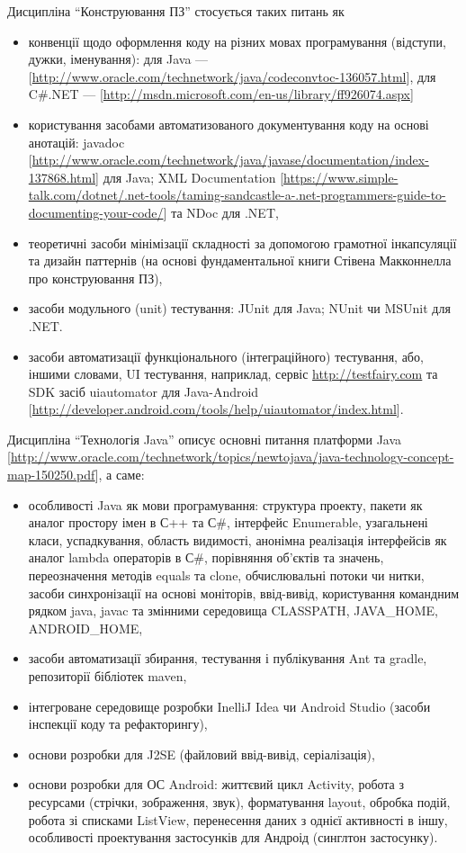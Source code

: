 Дисципліна ``Конструювання ПЗ'' стосується таких питань як
\begin{itemize} 
\item конвенції щодо оформлення коду на різних мовах програмування (відступи, дужки, іменування): для Java --- [\url{http://www.oracle.com/technetwork/java/codeconvtoc-136057.html}], 
для C\#.NET --- [\url{http://msdn.microsoft.com/en-us/library/ff926074.aspx}]
\item користування засобами автоматизованого документування коду на основі анотацій: javadoc [\url{http://www.oracle.com/technetwork/java/javase/documentation/index-137868.html}] для Java; XML Documentation [\url{https://www.simple-talk.com/dotnet/.net-tools/taming-sandcastle-a-.net-programmers-guide-to-documenting-your-code/}] та NDoc для .NET, 
\item теоретичні засоби мінімізації складності за допомогою грамотної інкапсуляції та дизайн паттернів (на основі фундаментальної книги Стівена Макконнелла про конструювання ПЗ),
\item засоби модульного (unit) тестування: JUnit для Java; NUnit чи MSUnit для .NET.
\item засоби автоматизації функціонального (інтеграційного) тестування, або, іншими словами, UI тестування, наприклад, сервіс \url{http://testfairy.com} та SDK засіб uiautomator для Java-Android [\url{http://developer.android.com/tools/help/uiautomator/index.html}].
\end{itemize}

Дисципліна ``Технологія Java'' описує основні питання платформи Java [\url{http://www.oracle.com/technetwork/topics/newtojava/java-technology-concept-map-150250.pdf}], а саме:
\begin{itemize}
\item особливості Java як мови програмування: структура проекту, пакети як аналог простору імен в С++ та С\#, інтерфейс Enumerable, узагальнені класи, успадкування, область видимості, анонімна реалізація інтерфейсів як аналог lambda операторів в С\#, порівняння об'єктів та значень, переозначення методів equals та clone, обчислювальні потоки чи нитки, засоби синхронізації на основі моніторів, ввід-вивід, користування командним рядком java, javac та змінними середовища CLASSPATH, JAVA\_HOME, ANDROID\_HOME,
\item засоби автоматизації збирання, тестування і публікування Ant та gradle, репозиторії бібліотек maven,
\item інтегроване середовище розробки InelliJ Idea чи Android Studio (засоби інспекції коду та рефакторингу),
\item основи розробки для J2SE (файловий ввід-вивід, серіалізація),
\item основи розробки для ОС Android: життєвий цикл Activity, робота з ресурсами (стрічки, зображення, звук), форматування layout, обробка подій, робота зі списками ListView, перенесення даних з однієї активності в іншу, особливості проектування застосунків для Андроід (синглтон застосунку).
\end{itemize}

